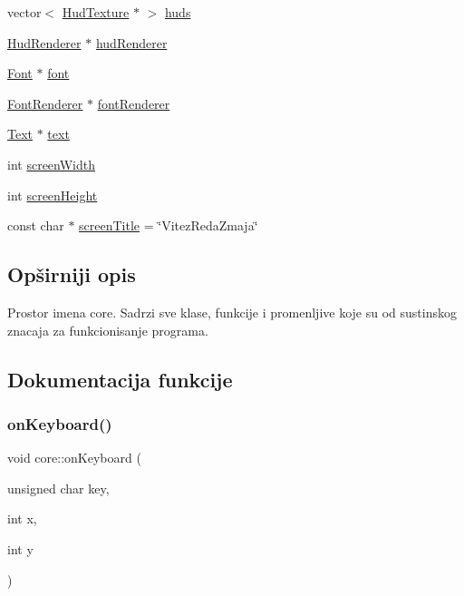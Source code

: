 \begin{DoxyCompactItemize}
\item 
vector$<$ \hyperlink{classhud_1_1HudTexture}{Hud\+Texture} $\ast$ $>$ \hyperlink{namespacecore_ad6858d3a6f10dffc125d162eab364996}{huds}
\item 
\hyperlink{classhud_1_1HudRenderer}{Hud\+Renderer} $\ast$ \hyperlink{namespacecore_aee35d512367a35873a31455fd218d84a}{hud\+Renderer}
\item 
\hyperlink{classfont_1_1Font}{Font} $\ast$ \hyperlink{namespacecore_a9c0aadaade788b336cfbba4db9c87a8e}{font}
\item 
\hyperlink{classfont_1_1FontRenderer}{Font\+Renderer} $\ast$ \hyperlink{namespacecore_ac8af6c1a584af6d86930b36660a73486}{font\+Renderer}
\item 
\hyperlink{classfont_1_1Text}{Text} $\ast$ \hyperlink{namespacecore_a7f65917b3299aa904f0516343ec522db}{text}
\item 
int \hyperlink{namespacecore_a1b1f1651effee4b2dba419d8381a9d60}{screen\+Width}
\item 
int \hyperlink{namespacecore_a985c45c5bff737ef922df5a06c814756}{screen\+Height}
\item 
const char $\ast$ \hyperlink{namespacecore_ab274ea2c748b3da9a978f504eab4ee85}{screen\+Title} = \char`\"{}Vitez\+Reda\+Zmaja\char`\"{}
\end{DoxyCompactItemize}


\subsection{Opširniji opis}
Prostor imena core. Sadrzi sve klase, funkcije i promenljive koje su od sustinskog znacaja za funkcionisanje programa. 

\subsection{Dokumentacija funkcije}
\mbox{\label{namespacecore_a179fad39a2b3f74cf7a0bffb578fce00}} 
\subsubsection{\texorpdfstring{on\+Keyboard()}{onKeyboard()}}
{\footnotesize\ttfamily void core\+::on\+Keyboard (\begin{DoxyParamCaption}\item[{unsigned char}]{key,  }\item[{int}]{x,  }\item[{int}]{y }\end{DoxyParamCaption})}




